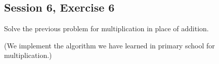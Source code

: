 \subsection {Session 6, Exercise 6}


Solve the previous problem for multiplication in place of addition.


(We implement the algorithm we have learned in primary school for multiplication.)